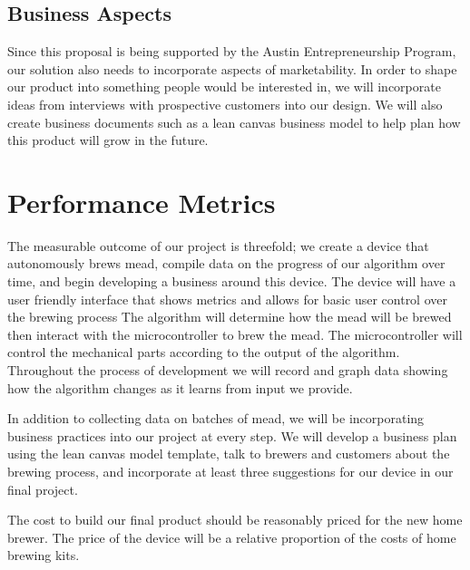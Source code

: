 \subsection{Business Aspects}
Since this proposal is being supported by the Austin Entrepreneurship Program, our 
solution also needs to incorporate aspects of marketability. In order to shape our 
product into something people would be interested in, we will incorporate ideas 
from interviews with prospective customers into our design. We will also create 
business documents such as a lean canvas business model to help plan how this product 
will grow in the future.
\section{Performance Metrics}
The measurable outcome of our project is threefold; we create a device that 
autonomously brews mead, compile data on the progress of our algorithm 
over time, and begin developing a business around this device. 
The device will have a user friendly interface that shows metrics and allows
for basic user control over the brewing process The algorithm will determine
how the mead will be brewed then interact with the microcontroller to brew 
the mead. The microcontroller will control the mechanical parts according to
the output of the algorithm. Throughout the process of development we 
will record and graph data showing how the algorithm changes as it learns 
from input we provide. 

In addition to collecting data on batches of mead, we will be 
incorporating business practices into our project at every step. We will 
develop a business plan using the lean canvas model template, talk to 
brewers and customers about the brewing process, and incorporate at least 
three suggestions for our device in our final project.

The cost to build our final product should be reasonably priced for the new home brewer. 
The price of the device will be a relative proportion of the costs of home brewing kits.

